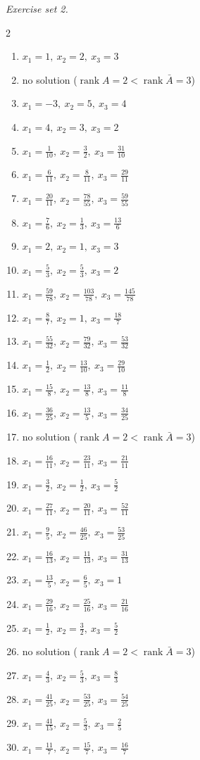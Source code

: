 \par\noindent\emph{Exercise set 2.}\nopagebreak
\begin{multicols}{2}\raggedright
\begin{enumerate}[label=\arabic*., leftmargin=*, itemsep=1pt]
\item $x_1=1,\ x_2=2,\ x_3=3$
\item no solution ($\operatorname{rank}A=2<\operatorname{rank}\bar A=3$)
\item $x_1=-3,\ x_2=5,\ x_3=4$
\item $x_1=4,\ x_2=3,\ x_3=2$
\item $x_1=\frac{1}{10},\ x_2=\frac{3}{2},\ x_3=\frac{31}{10}$
\item $x_1=\frac{6}{11},\ x_2=\frac{8}{11},\ x_3=\frac{29}{11}$
\item $x_1=\frac{20}{11},\ x_2=\frac{78}{55},\ x_3=\frac{59}{55}$
\item $x_1=\frac{7}{6},\ x_2=\frac{1}{3},\ x_3=\frac{13}{6}$
\item $x_1=2,\ x_2=1,\ x_3=3$
\item $x_1=\frac{5}{3},\ x_2=\frac{5}{3},\ x_3=2$
\item $x_1=\frac{59}{78},\ x_2=\frac{103}{78},\ x_3=\frac{145}{78}$
\item $x_1=\frac{8}{7},\ x_2=1,\ x_3=\frac{18}{7}$
\item $x_1=\frac{55}{32},\ x_2=\frac{79}{32},\ x_3=\frac{53}{32}$
\item $x_1=\frac{1}{2},\ x_2=\frac{13}{10},\ x_3=\frac{29}{10}$
\item $x_1=\frac{15}{8},\ x_2=\frac{13}{8},\ x_3=\frac{11}{8}$
\item $x_1=\frac{36}{25},\ x_2=\frac{13}{5},\ x_3=\frac{34}{25}$
\item no solution ($\operatorname{rank}A=2<\operatorname{rank}\bar A=3$)
\item $x_1=\frac{16}{11},\ x_2=\frac{23}{11},\ x_3=\frac{21}{11}$
\item $x_1=\frac{3}{2},\ x_2=\frac{1}{2},\ x_3=\frac{5}{2}$
\item $x_1=\frac{27}{11},\ x_2=\frac{20}{11},\ x_3=\frac{52}{11}$
\item $x_1=\frac{9}{5},\ x_2=\frac{46}{25},\ x_3=\frac{53}{25}$
\item $x_1=\frac{16}{13},\ x_2=\frac{11}{13},\ x_3=\frac{31}{13}$
\item $x_1=\frac{13}{5},\ x_2=\frac{6}{5},\ x_3=1$
\item $x_1=\frac{29}{16},\ x_2=\frac{25}{16},\ x_3=\frac{21}{16}$
\item $x_1=\frac{1}{2},\ x_2=\frac{3}{2},\ x_3=\frac{5}{2}$
\item no solution ($\operatorname{rank}A=2<\operatorname{rank}\bar A=3$)
\item $x_1=\frac{4}{3},\ x_2=\frac{5}{3},\ x_3=\frac{8}{3}$
\item $x_1=\frac{41}{25},\ x_2=\frac{53}{25},\ x_3=\frac{54}{25}$
\item $x_1=\frac{41}{15},\ x_2=\frac{5}{3},\ x_3=\frac{2}{5}$
\item $x_1=\frac{11}{7},\ x_2=\frac{15}{7},\ x_3=\frac{16}{7}$
\end{enumerate}
\end{multicols}
